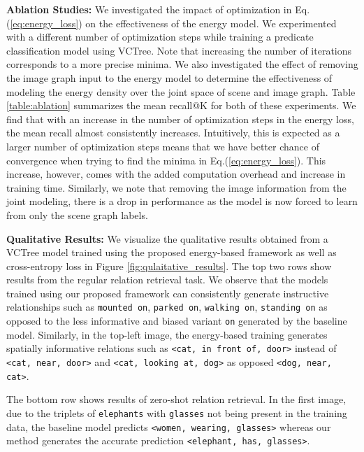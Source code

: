 \documentclass[final]{cvpr}
\begin{document}
\vspace{0.06in}
\noindent
{\bf Ablation Studies:}
We investigated the impact of optimization in Eq.(\ref{eq:energy_loss}) on the effectiveness of the energy model. We experimented with a different number of optimization steps while training a predicate classification model using VCTree. Note that increasing the number of iterations corresponds to a more precise minima. We also investigated the effect of removing the image graph input to the energy model to determine the effectiveness of modeling the energy density over the joint space of scene and image graph. Table \ref{table:ablation} summarizes the mean recall@K for both of these experiments. We find that with an increase in the number of optimization steps in the energy loss, the mean recall almost consistently increases. Intuitively, this is expected as a larger number of optimization steps means that we have better chance of convergence when trying to find the minima in Eq.(\ref{eq:energy_loss}). This increase, however, comes with the added computation overhead and increase in training time. Similarly, we note that removing the image information from the joint modeling, there is a drop in performance as the model is now forced to learn from only the scene graph labels.

\vspace{0.06in}
\noindent
{\bf Qualitative Results:}
We visualize the qualitative results obtained from a VCTree model trained using the proposed energy-based framework as well as cross-entropy loss in Figure \ref{fig:qulaitative_results}. The top two rows show results from the regular relation retrieval task. We observe that the models trained using our proposed framework can consistently generate instructive relationships such as \texttt{mounted on}, \texttt{parked on}, \texttt{walking on}, \texttt{standing on} as opposed to the less informative and biased variant \texttt{on} generated by the baseline model. Similarly, in the top-left image, the energy-based training generates spatially informative relations such as \texttt{<cat, in front of, door>} instead of \texttt{<cat, near, door>} and \texttt{<cat, looking at, dog>} as opposed \texttt{<dog, near, cat>}. 

The bottom row shows results of zero-shot relation retrieval. In the first image, due to the triplets of \texttt{elephants} with \texttt{glasses} not being present in the training data, the baseline model predicts \texttt{<women, wearing, glasses>} whereas our method generates the accurate prediction \texttt{<elephant, has, glasses>}.
\end{document}
